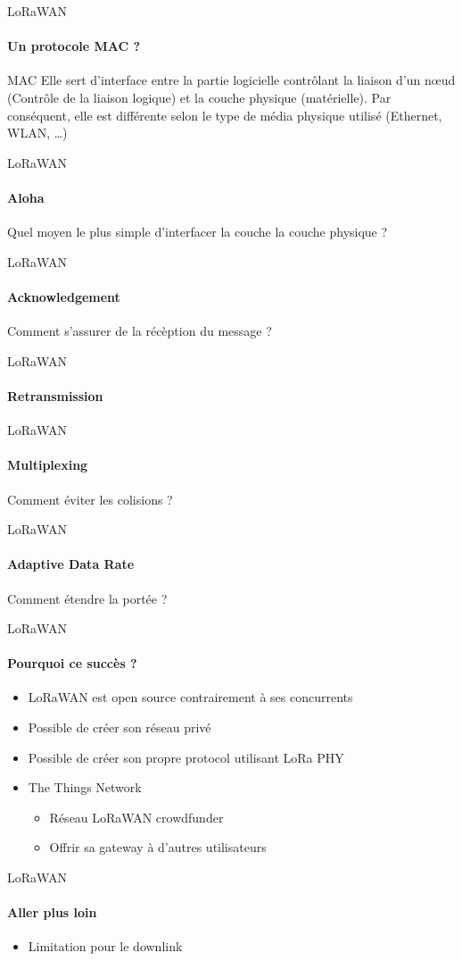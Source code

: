 \begin{frame}{LoRaWAN}
\framesubtitle{Un protocole MAC ?}

\begin{block}{MAC}
Elle sert d'interface entre la partie logicielle contrôlant la 
liaison d'un nœud (Contrôle de la liaison logique) et la couche 
physique (matérielle). Par conséquent, elle est différente selon 
le type de média physique utilisé (Ethernet, WLAN, …)
\end{block}

\end{frame}

\begin{frame}{LoRaWAN}
\framesubtitle{Aloha}
\begin{block}{}
{
  Quel moyen le plus simple d'interfacer la couche la couche physique ?
}
\end{block}

\end{frame}

\begin{frame}{LoRaWAN}
\framesubtitle{Acknowledgement}
\begin{block}{}
{
  Comment s'assurer de la récèption du message ?
}
\end{block}

\end{frame}

\begin{frame}{LoRaWAN}
\framesubtitle{Retransmission}

\end{frame}

\begin{frame}{LoRaWAN}
\framesubtitle{Multiplexing}
\begin{block}{}
{
  Comment éviter les colisions ?
}
\end{block}

\end{frame}

\begin{frame}{LoRaWAN}
\framesubtitle{Adaptive Data Rate}
\begin{block}{}
{
  Comment étendre la portée ?
}
\end{block}

\end{frame}

\begin{frame}{LoRaWAN}
\framesubtitle{Pourquoi ce succès ?}
\begin{itemize}
  \item LoRaWAN est open source contrairement à ses concurrents
  \item Possible de créer son réseau privé  
  \item Possible de créer son propre protocol utilisant LoRa PHY
  \item The Things Network
  \begin{itemize}
    \item Réseau LoRaWAN crowdfunder
    \item Offrir sa gateway à d'autres utilisateurs
  \end{itemize}
\end{itemize}
\end{frame}

\begin{frame}{LoRaWAN}
\framesubtitle{Aller plus loin}
\begin{itemize}
  \item Limitation pour le downlink
\end{itemize}
\end{frame}
